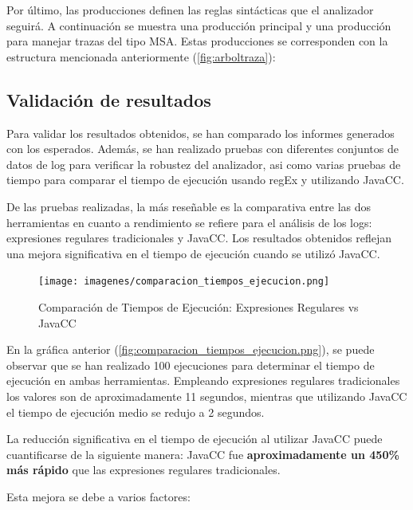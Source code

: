 Por último, las producciones definen las reglas sintácticas que el analizador seguirá. A continuación se muestra una producción principal y una producción para manejar trazas del tipo MSA. Estas producciones se corresponden con la estructura mencionada anteriormente (\autoref{fig:arboltraza}):

\lstset{inputencoding=utf8/latin1}


\subsection{Validación de resultados}

\noindent Para validar los resultados obtenidos, se han comparado los informes generados con los esperados. Además, se han realizado pruebas con diferentes conjuntos de datos de log para verificar la robustez del analizador, asi como varias pruebas de tiempo para comparar el tiempo de ejecución usando regEx y utilizando JavaCC. 

De las pruebas realizadas, la más reseñable es la comparativa entre las dos herramientas en cuanto a rendimiento se refiere para el análisis de los logs: expresiones regulares tradicionales y JavaCC. Los resultados obtenidos reflejan una mejora significativa en el tiempo de ejecución cuando se utilizó JavaCC.

\begin{figure}[H]
\centering
\texttt{[image: imagenes/comparacion\_tiempos\_ejecucion.png]}
\caption{Comparación de Tiempos de Ejecución: Expresiones Regulares vs JavaCC}
\label{fig:comparacion_tiempos_ejecucion.png}
\end{figure}

\noindent En la gráfica anterior (\autoref{fig:comparacion_tiempos_ejecucion.png}), se puede observar que se han realizado 100 ejecuciones para determinar el tiempo de ejecución en ambas herramientas. Empleando expresiones regulares tradicionales los valores son de aproximadamente 11 segundos, mientras que utilizando JavaCC el tiempo de ejecución medio se redujo a 2 segundos.

La reducción significativa en el tiempo de ejecución al utilizar JavaCC puede cuantificarse de la siguiente manera: JavaCC fue \textbf{aproximadamente un 450\% más rápido} que las expresiones regulares tradicionales.

Esta mejora se debe a varios factores:

